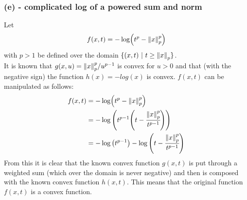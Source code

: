 \documentclass[letter]{article}
\begin{document}
\subsubsection{(e) - complicated log of a powered sum and norm}
Let $$ f(x,t) = - \log(t^p - \norm{x}_p^p)$$ with $p >1$ be defined over the domain $\{(x,t) \ | \ t \geq \norm{x}_p\}$.\\
It is known that $g(x,u) = \norm{x}_p^p / u^{p-1}$ is convex for $u > 0$ and that (with the negative sign) the function $h(x) = - log(x)$ is convex.
$f(x,t)$ can be manipulated as follows:
\begin{align}
	f(x,t)	&= -\log(t^p - \norm{x}_p^p)\\
			&= -\log\qty(t^{p-1}\qty(t - \cfrac{\norm{x}_p^p}{t^{p-1}}))\\
			&= -\log\qty(t^{p-1}) - \log\qty(t - \cfrac{\norm{x}_p^p}{t^{p-1}})
\end{align}
From this it is clear that the known convex function $g(x,t)$ is put through a weighted sum (which over the domain is never negative) and then is composed with the known convex function $h(x,t)$. This means that the original function $f(x,t)$ is a convex function.
\end{document}
